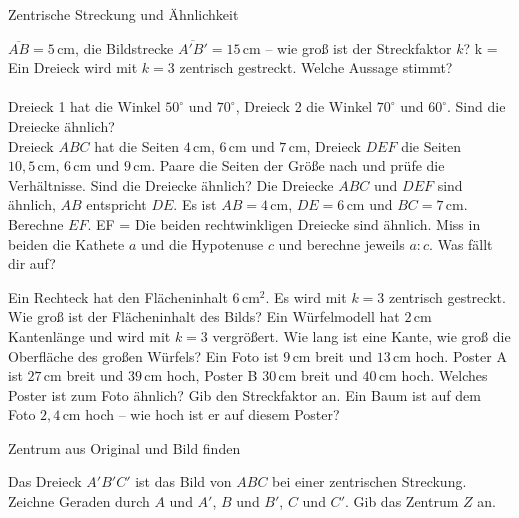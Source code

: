 \begin{aufgabe}{Zentrische Streckung und Ähnlichkeit}
\begin{teile}
\begin{ksys}[xmin=0,xmax=10,ymin=0,ymax=9]\end{ksys}
\teil $\overline{AB} = 5\,\text{cm}$, die Bildstrecke $\overline{A'B'} = 15\,\text{cm}$ – wie groß ist der Streckfaktor $k$? k = \leerfeld
\teil Ein Dreieck wird mit $k = 3$ zentrisch gestreckt. Welche Aussage stimmt?  \\  \\ 
\teil Dreieck 1 hat die Winkel $50^\circ$ und $70^\circ$, Dreieck 2 die Winkel $70^\circ$ und $60^\circ$. Sind die Dreiecke ähnlich?  \\ 
\teil Dreieck $ABC$ hat die Seiten $4\,\text{cm}$, $6\,\text{cm}$ und $7\,\text{cm}$, Dreieck $DEF$ die Seiten $10{,}5\,\text{cm}$, $6\,\text{cm}$ und $9\,\text{cm}$. Paare die Seiten der Größe nach und prüfe die Verhältnisse. Sind die Dreiecke ähnlich?
\teil Die Dreiecke $ABC$ und $DEF$ sind ähnlich, $AB$ entspricht $DE$. Es ist $AB = 4\,\text{cm}$, $DE = 6\,\text{cm}$ und $BC = 7\,\text{cm}$. Berechne $EF$. EF = \leerfeld[cm]
\teil Die beiden rechtwinkligen Dreiecke sind ähnlich. Miss in beiden die Kathete $a$ und die Hypotenuse $c$ und berechne jeweils $a : c$. Was fällt dir auf?

 \quad {}
\teil Ein Rechteck hat den Flächeninhalt $6\,\text{cm}^2$. Es wird mit $k = 3$ zentrisch gestreckt. Wie groß ist der Flächeninhalt des Bilds? \leerfeld[cm²]
\teil Ein Würfelmodell hat $2\,\text{cm}$ Kantenlänge und wird mit $k = 3$ vergrößert. Wie lang ist eine Kante, wie groß die Oberfläche des großen Würfels?
\teil Ein Foto ist $9\,\text{cm}$ breit und $13\,\text{cm}$ hoch. Poster A ist $27\,\text{cm}$ breit und $39\,\text{cm}$ hoch, Poster B $30\,\text{cm}$ breit und $40\,\text{cm}$ hoch. Welches Poster ist zum Foto ähnlich? Gib den Streckfaktor an. Ein Baum ist auf dem Foto $2{,}4\,\text{cm}$ hoch – wie hoch ist er auf diesem Poster?
\end{teile}
\end{aufgabe}

\begin{aufgabe}{Zentrum aus Original und Bild finden}
\begin{teile}
\teil Das Dreieck $A'B'C'$ ist das Bild von $ABC$ bei einer zentrischen Streckung. Zeichne Geraden durch $A$ und $A'$, $B$ und $B'$, $C$ und $C'$. Gib das Zentrum $Z$ an.

\begin{ksys}[xmin=0,xmax=9,ymin=0,ymax=7]\end{ksys}
\end{teile}
\end{aufgabe}

